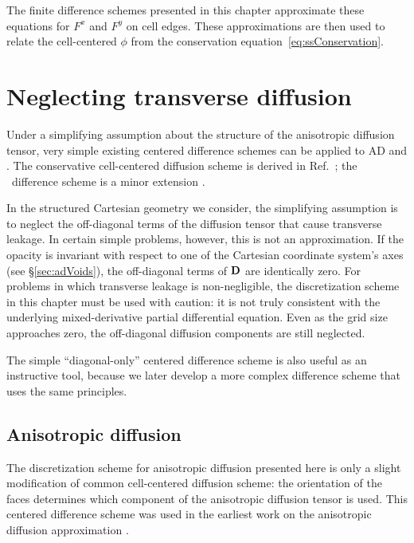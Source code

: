 The finite difference schemes presented in this chapter approximate these
equations for $F^{x}$ and $F^{y}$ on cell edges. These approximations are then
used to relate the cell-centered $\phi$ from the conservation
equation~\eqref{eq:ssConservation}.

\section{Neglecting transverse diffusion}\label{sec:discreteDiag}

Under a simplifying assumption about the structure of the anisotropic diffusion
tensor, very simple existing centered difference schemes can be
applied to AD and \APone. The conservative cell-centered diffusion scheme is
derived in Ref.~\cite{Dud1976}; the \APone\ difference scheme is a minor
extension \cite{War2003}.

In the structured Cartesian geometry we consider, the simplifying assumption is
to neglect the off-diagonal terms of the diffusion tensor that cause transverse
leakage.
In certain simple problems, however, this is not an approximation. If the
opacity is invariant with respect to one of the Cartesian coordinate system's
axes (see \S\ref{sec:adVoids}), the off-diagonal terms of $\mathbf{D}$ are
identically zero. For problems in which transverse leakage is non-negligible,
the discretization scheme in this chapter must be used with caution: it is not
truly consistent with the underlying mixed-derivative partial differential
equation. Even as the grid size approaches zero, the off-diagonal diffusion
components are still neglected.

The simple ``diagonal-only'' centered difference scheme is also useful as an
instructive tool, because we later develop a more complex difference scheme that
uses the same principles.

\subsection{Anisotropic diffusion}
The discretization scheme for anisotropic diffusion presented here is only a
slight modification of common cell-centered diffusion scheme: the
orientation of the faces determines which component of the anisotropic diffusion
tensor is used.  This centered difference scheme was used in the earliest work
on the anisotropic diffusion approximation \cite{Lar2009c}.

